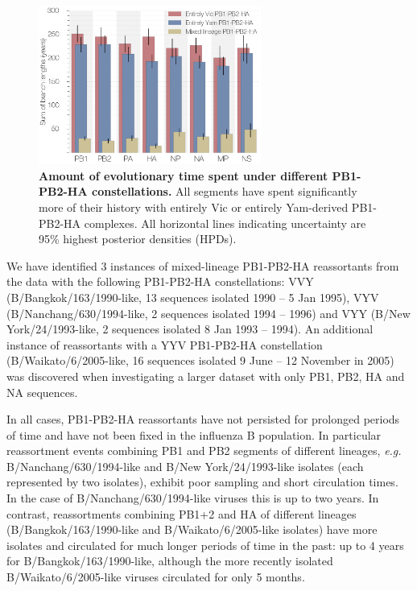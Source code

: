 \documentclass[11pt,oneside,letterpaper]{article}
\begin{document}
\begin{figure}[h]
	\centering		
	\includegraphics[width=0.65\textwidth]{figures/InfB_stateTime.png}
	\caption{\textbf{Amount of evolutionary time spent under different PB1-PB2-HA constellations.}
All segments have spent significantly more of their history with entirely Vic or entirely Yam-derived PB1-PB2-HA complexes.
All horizontal lines indicating uncertainty are 95\% highest posterior densities (HPDs).}
	\label{stateTime}
\end{figure}

We have identified 3 instances of mixed-lineage PB1-PB2-HA reassortants from the data with the following PB1-PB2-HA constellations: VVY (B/Bangkok/163/1990-like, 13 sequences isolated 1990 -- 5 Jan 1995), VYV (B/Nanchang/630/1994-like, 2 sequences isolated 1994 -- 1996) and VYY (B/New York/24/1993-like, 2 sequences isolated 8 Jan 1993 -- 1994).
An additional instance of reassortants with a YYV PB1-PB2-HA constellation (B/Waikato/6/2005-like, 16 sequences isolated 9 June -- 12 November in 2005) was discovered when investigating a larger dataset with only PB1, PB2, HA and NA sequences.

In all cases, PB1-PB2-HA reassortants have not persisted for prolonged periods of time and have not been fixed in the influenza B population.
In particular reassortment events combining PB1 and PB2 segments of different lineages, \textit{e.g.} B/Nanchang/630/1994-like and B/New York/24/1993-like isolates (each represented by two isolates), exhibit poor sampling and short circulation times.
In the case of B/Nanchang/630/1994-like viruses this is up to two years.
In contrast, reassortments combining PB1+2 and HA of different lineages (B/Bangkok/163/1990-like and B/Waikato/6/2005-like isolates) have more isolates and circulated for much longer periods of time in the past: up to 4 years for B/Bangkok/163/1990-like, although the more recently isolated B/Waikato/6/2005-like viruses circulated for only 5 months.
\end{document}
